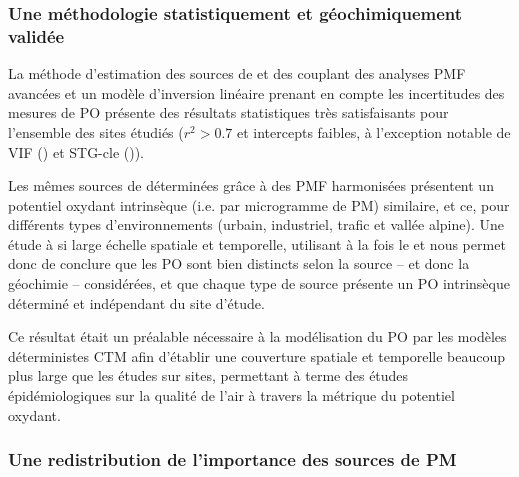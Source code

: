 \subsubsection{Une méthodologie statistiquement et géochimiquement validée}%
\label{ssub:une_méthodologie_statistiquement_et_géochimiquement_validée}

La méthode d'estimation des sources de \POAA{} et \PODTT{} des \PMdix{} couplant des
analyses PMF avancées et un modèle d'inversion linéaire prenant en compte les incertitudes
des mesures de PO présente des résultats statistiques très satisfaisants pour l'ensemble
des sites étudiés ($r^2>0.7$ et intercepts faibles, à l'exception notable de VIF (\PODTT) et
STG-cle (\POAA)).

Les mêmes sources de \PMdix{} déterminées grâce à des PMF harmonisées présentent un potentiel
oxydant intrinsèque (i.e. par microgramme de PM) similaire, et ce, pour différents types
d'environnements (urbain, industriel, trafic et vallée alpine). Une étude à si large
échelle spatiale et temporelle, utilisant à la fois le \POAA{} et \PODTT{} nous permet
donc de conclure que les PO sont bien distincts selon la source -- et donc la géochimie --
considérées, et que chaque type de source présente un PO intrinsèque déterminé et
indépendant du site d'étude.

Ce résultat était un préalable nécessaire à la modélisation du PO par les modèles
déterministes CTM afin d'établir une couverture spatiale et temporelle beaucoup plus
large que les études sur sites, permettant à terme des études épidémiologiques sur la
qualité de l'air à travers la métrique du potentiel oxydant.

\subsubsection{Une redistribution de l'importance des sources de PM}%
\label{ssub:une_redistribution_de_l_importance_des_sources_de_pm}

